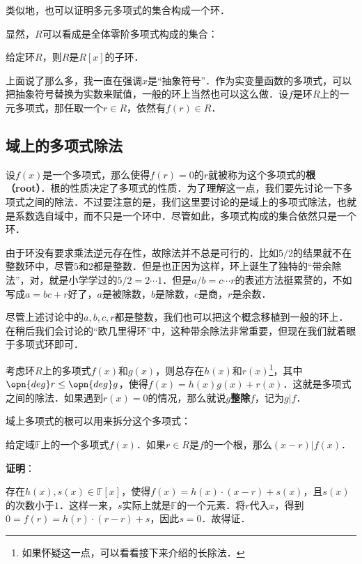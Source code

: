 类似地，也可以证明多元多项式的集合构成一个环．


显然，$R$可以看成是全体零阶多项式构成的集合：

\begin{exercise}{}
给定环$R$，则$R$是$R[x]$的子环．
\end{exercise}






上面说了那么多，我一直在强调$x$是“抽象符号”．作为实变量函数的多项式，可以把抽象符号替换为实数来赋值，一般的环上当然也可以这么做．设$f$是环$R$上的一元多项式，那任取一个$r\in R$，依然有$f(r)\in R$．




\subsection{域上的多项式除法}

设$f(x)$是一个多项式，那么使得$f(r)=0$的$r$就被称为这个多项式的\textbf{根（root）}．根的性质决定了多项式的性质．为了理解这一点，我们要先讨论一下多项式之间的除法．不过要注意的是，我们这里要讨论的是域上的多项式除法，也就是系数选自域中，而不只是一个环中．尽管如此，多项式构成的集合依然只是一个环．

由于环没有要求乘法逆元存在性，故除法并不总是可行的．比如$5/2$的结果就不在整数环中，尽管$5$和$2$都是整数．但是也正因为这样，环上诞生了独特的“带余除法”，对，就是小学学过的$5/2=2\cdots 1$．但是$a/b=c\cdots r$的表述方法挺累赘的，不如写成$a=bc+r$好了，$a$是被除数，$b$是除数，$c$是商，$r$是余数．

尽管上述讨论中的$a, b, c, r$都是整数，我们也可以把这个概念移植到一般的环上．在稍后我们会讨论的“欧几里得环”中，这种带余除法非常重要，但现在我们就着眼于多项式环即可．

考虑环$R$上的多项式$f(x)$和$g(x)$，则总存在$h(x)$和$r(x)$\footnote{如果怀疑这一点，可以看看接下来介绍的长除法．}，其中$\opn{deg}r\leq\opn{deg}g$，使得$f(x)=h(x)g(x)+r(x)$．这就是多项式之间的除法．如果遇到$r(x)=0$的情况，那么就说$g$\textbf{整除}$f$，记为$g|f$．

域上多项式的根可以用来拆分这个多项式：

\begin{theorem}{}\label{RPlynm_the1}
给定域$\mathbb{F}$上的一个多项式$f(x)$．如果$r\in R$是$f$的一个根，那么$(x-r)|f(x)$．
\end{theorem}

\textbf{证明}：

存在$h(x), s(x)\in\mathbb{F}[x]$，使得$f(x)=h(x)\cdot(x-r)+s(x)$，且$s(x)$的次数小于$1$．这样一来，$s$实际上就是$\mathbb{F}$的一个元素．将$r$代入$x$，得到$0=f(r)=h(r)\cdot(r-r)+s$，因此$s=0$．故得证．

